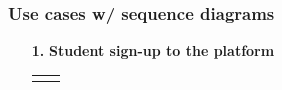 \documentclass{article}
\begin{document}
{\begin{itemize}
\end{itemize}
\subsubsection{Use cases w/ sequence diagrams}
\begin{enumerate}
    \item[\textbf{1.}] \textbf{Student sign-up to the platform}

          \begin{xltabular}{\textwidth}
              {| >{\raggedright\arraybackslash}g | >{\raggedright\arraybackslash}X |}
              \hline
              \endfirsthead
              \hline
              \endhead
              \endfoot
              \hline
              \endlastfoot





\end{xltabular}
\end{enumerate}}
\end{document}
